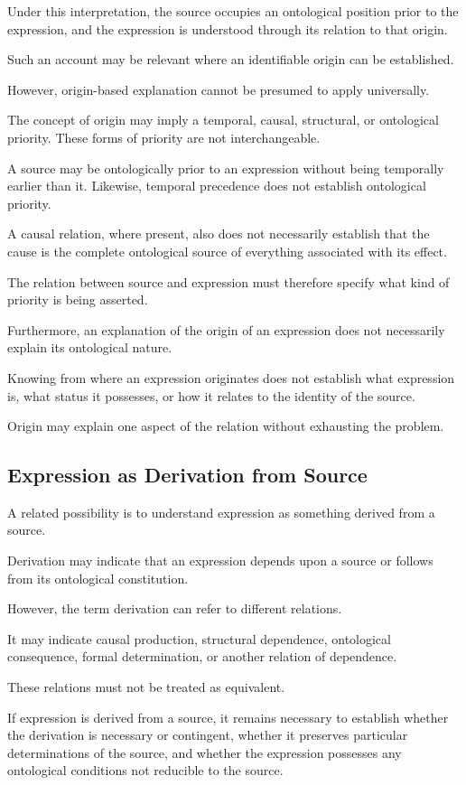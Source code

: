 Under this interpretation, the source occupies
an ontological position prior to the expression,
and the expression is understood through its
relation to that origin.

Such an account may be relevant where an identifiable
origin can be established.

However, origin-based explanation cannot be
presumed to apply universally.

The concept of origin may imply a temporal,
causal, structural, or ontological priority.
These forms of priority are not interchangeable.

A source may be ontologically prior to an expression
without being temporally earlier than it.
Likewise, temporal precedence does not establish
ontological priority.

A causal relation, where present, also does not
necessarily establish that the cause is the
complete ontological source of everything
associated with its effect.

The relation between source and expression
must therefore specify what kind of priority
is being asserted.

Furthermore, an explanation of the origin of
an expression does not necessarily explain
its ontological nature.

Knowing from where an expression originates
does not establish what expression is, what
status it possesses, or how it relates to
the identity of the source.

Origin may explain one aspect of the relation
without exhausting the problem.

\subsection{Expression as Derivation from Source}

A related possibility is to understand expression
as something derived from a source.

Derivation may indicate that an expression
depends upon a source or follows from its
ontological constitution.

However, the term derivation can refer to
different relations.

It may indicate causal production, structural
dependence, ontological consequence, formal
determination, or another relation of dependence.

These relations must not be treated as equivalent.

If expression is derived from a source, it remains
necessary to establish whether the derivation
is necessary or contingent, whether it preserves
particular determinations of the source, and
whether the expression possesses any ontological
conditions not reducible to the source.

